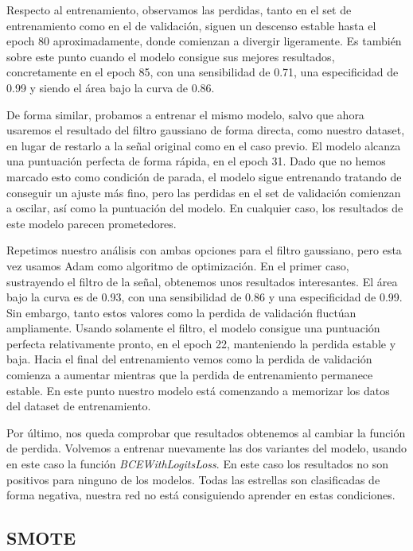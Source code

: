 Respecto al entrenamiento, observamos las perdidas, tanto en el set de entrenamiento como en el de validación, siguen un descenso estable hasta el epoch 80 aproximadamente, donde comienzan a divergir ligeramente. Es también sobre este punto cuando el modelo consigue sus mejores resultados, concretamente en el epoch 85, con una sensibilidad de 0.71, una especificidad de 0.99 y siendo el área bajo la curva de 0.86.


De forma similar, probamos a entrenar el mismo modelo, salvo que ahora usaremos el resultado del filtro gaussiano de forma directa, como nuestro dataset, en lugar de restarlo a la señal original como en el caso previo. El modelo alcanza una puntuación perfecta de forma rápida, en el epoch 31. Dado que no hemos marcado esto como condición de parada, el modelo sigue entrenando tratando de conseguir un ajuste más fino, pero las perdidas en el set de validación comienzan a oscilar, así como la puntuación del modelo. En cualquier caso, los resultados de este modelo parecen prometedores.

Repetimos nuestro análisis con ambas opciones para el filtro gaussiano, pero esta vez usamos Adam como algoritmo de optimización. En el primer caso, sustrayendo el filtro de la señal, obtenemos unos resultados interesantes. El área bajo la curva es de 0.93, con una sensibilidad de 0.86 y una especificidad de 0.99. Sin embargo, tanto estos valores como la perdida de validación fluctúan ampliamente. Usando solamente el filtro, el modelo consigue una puntuación perfecta relativamente pronto, en el epoch 22, manteniendo la perdida estable y baja. Hacia el final del entrenamiento vemos como la perdida de validación comienza a aumentar mientras que la perdida de entrenamiento permanece estable. En este punto nuestro modelo está comenzando a memorizar los datos del dataset de entrenamiento.

Por último, nos queda comprobar que resultados obtenemos al cambiar la función de perdida. Volvemos a entrenar nuevamente las dos variantes del modelo, usando en este caso la función \textit{BCEWithLogitsLoss}. En este caso los resultados no son positivos para ninguno de los modelos. Todas las estrellas son clasificadas de forma negativa, nuestra red no está consiguiendo aprender en estas condiciones. 

\subsection{SMOTE}

